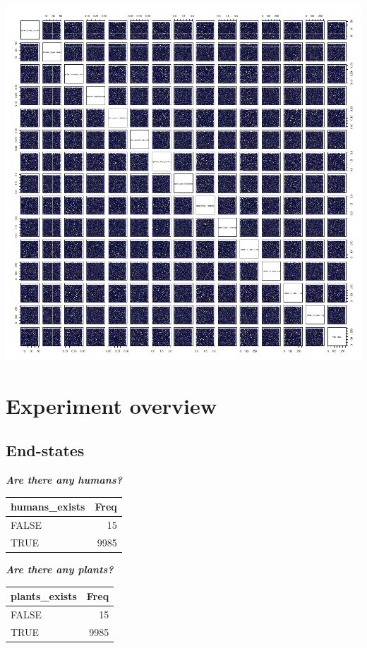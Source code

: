 \documentclass[
]{book}
\begin{document}
\includegraphics[width=1\linewidth]{plots/5_LHS_parameter_values_pairsPlot}

\newpage

\hypertarget{experiment-overview}{%
\section{Experiment overview}\label{experiment-overview}}

\hypertarget{end-states-1}{%
\subsection{End-states}\label{end-states-1}}

\textbf{\emph{Are there any humans?}}

\begin{tabular}{l|r}
\hline
humans\_exists & Freq\\
\hline
FALSE & 15\\
\hline
TRUE & 9985\\
\hline
\end{tabular}

\textbf{\emph{Are there any plants?}}

\begin{tabular}{l|r}
\hline
plants\_exists & Freq\\
\hline
FALSE & 15\\
\hline
TRUE & 9985\\
\hline
\end{tabular}
\end{document}
